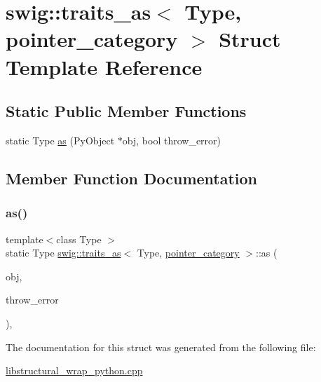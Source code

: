 \hypertarget{structswig_1_1traits__as_3_01_type_00_01pointer__category_01_4}{}\section{swig\+:\+:traits\+\_\+as$<$ Type, pointer\+\_\+category $>$ Struct Template Reference}
\label{structswig_1_1traits__as_3_01_type_00_01pointer__category_01_4}
\subsection*{Static Public Member Functions}
\begin{DoxyCompactItemize}
\item 
static Type \hyperlink{structswig_1_1traits__as_3_01_type_00_01pointer__category_01_4_af4d6146e7890c389c1a8c87ff57a0366}{as} (Py\+Object $\ast$obj, bool throw\+\_\+error)
\end{DoxyCompactItemize}


\subsection{Member Function Documentation}
\mbox{\label{structswig_1_1traits__as_3_01_type_00_01pointer__category_01_4_af4d6146e7890c389c1a8c87ff57a0366}} 
\subsubsection{\texorpdfstring{as()}{as()}}
{\footnotesize\ttfamily template$<$class Type $>$ \\
static Type \hyperlink{structswig_1_1traits__as}{swig\+::traits\+\_\+as}$<$ Type, \hyperlink{structswig_1_1pointer__category}{pointer\+\_\+category} $>$\+::as (\begin{DoxyParamCaption}\item[{Py\+Object $\ast$}]{obj,  }\item[{bool}]{throw\+\_\+error }\end{DoxyParamCaption})\hspace{0.3cm}{\ttfamily [inline]}, {\ttfamily [static]}}



The documentation for this struct was generated from the following file\+:\begin{DoxyCompactItemize}
\item 
\hyperlink{libstructural__wrap__python_8cpp}{libstructural\+\_\+wrap\+\_\+python.\+cpp}\end{DoxyCompactItemize}
